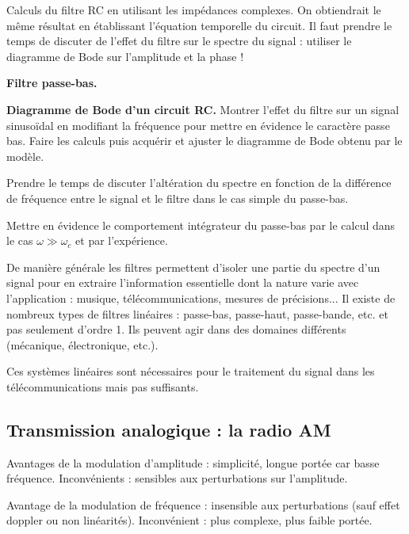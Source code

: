 Calculs du filtre RC en utilisant les impédances complexes.
On obtiendrait le même résultat en établissant l'équation temporelle du circuit.
Il faut prendre le temps de discuter de l'effet du filtre sur le spectre du signal : utiliser le diagramme de Bode sur l'amplitude et la phase !

\begin{slide}
\textbf{Filtre passe-bas.}
\end{slide}

\begin{experience}
\textbf{Diagramme de Bode d'un circuit RC.}
Montrer l'effet du filtre sur un signal sinusoïdal en modifiant la fréquence pour mettre en évidence le caractère passe bas.
Faire les calculs puis acquérir et ajuster le diagramme de Bode obtenu par le modèle.
\end{experience}

\begin{remarque}
Prendre le temps de discuter l'altération du spectre en fonction de la différence de fréquence entre le signal et le filtre dans le cas simple du passe-bas.
\end{remarque}

Mettre en évidence le comportement intégrateur du passe-bas par le calcul dans le cas $\omega\gg\omega_c$ et par l'expérience.

De manière générale les filtres permettent d'isoler une partie du spectre d'un signal pour en extraire l'information essentielle dont la nature varie avec l'application : musique, télécommunications, mesures de précisions...
Il existe de nombreux types de filtres linéaires : passe-bas, passe-haut, passe-bande, etc. et pas seulement d'ordre 1.
Ils peuvent agir dans des domaines différents (mécanique, électronique, etc.).

\begin{transition}
Ces systèmes linéaires sont nécessaires pour le traitement du signal dans les télécommunications mais pas suffisants.
\end{transition}

\subsection{Transmission analogique : la radio AM}

\begin{remarque}
Avantages de la modulation d'amplitude : simplicité, longue portée car basse fréquence.
Inconvénients : sensibles aux perturbations sur l'amplitude.

\noindent
Avantage de la modulation de fréquence : insensible aux perturbations (sauf effet doppler ou non linéarités).
Inconvénient : plus complexe, plus faible portée.
\end{remarque}

